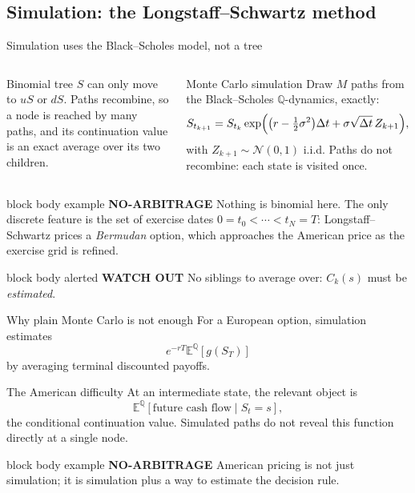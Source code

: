 \documentclass[handout,10pt,aspectratio=169]{beamer}
\newenvironment{marketbox}{\begin{beamercolorbox}[rounded=true,sep=0.7em,wd=\textwidth]{block body example}
  \textbf{\color{CourseGreen}NO-ARBITRAGE}\quad}{\end{beamercolorbox}}
\newenvironment{simplificationbox}{\begin{beamercolorbox}[rounded=true,sep=0.7em,wd=\textwidth]{block body alerted}
  \textbf{\color{CourseRed}WATCH OUT}\quad}{\end{beamercolorbox}}
\newcommand{\E}{\mathbb E}
\newcommand{\Q}{\mathbb Q}
\begin{document}
\subsection{Simulation: the Longstaff--Schwartz method}

\begin{frame}{Simulation uses the Black--Scholes model, not a tree}
\small
\begin{columns}[T,onlytextwidth]
\begin{block}{Binomial tree}
\(S\) can only move to \(uS\) or \(dS\). Paths recombine, so a node is
reached by many paths, and its continuation value is an exact average over
its two children.
\end{block}
\begin{exampleblock}{Monte Carlo simulation}
Draw \(M\) paths from the Black--Scholes \(\Q\)-dynamics, exactly:
\[
S_{t_{k+1}}=S_{t_k}\exp\Bigl(\bigl(r-\tfrac12\sigma^2\bigr)\Delta t
+\sigma\sqrt{\Delta t}\,Z_{k+1}\Bigr),
\]
with \(Z_{k+1}\sim\mathcal N(0,1)\) i.i.d. Paths do not recombine: each state
is visited once.
\end{exampleblock}
\end{columns}
\begin{marketbox}
Nothing is binomial here. The only discrete feature is the set of exercise
dates \(0=t_0<\cdots<t_N=T\): Longstaff--Schwartz prices a \emph{Bermudan}
option, which approaches the American price as the exercise grid is refined.
\end{marketbox}
\begin{simplificationbox}
No siblings to average over: \(C_k(s)\) must be \emph{estimated}.
\end{simplificationbox}
\end{frame}

\begin{frame}{Why plain Monte Carlo is not enough}
For a European option, simulation estimates
\[
e^{-rT}\E^\Q[g(S_T)]
\]
by averaging terminal discounted payoffs.
\begin{alertblock}{The American difficulty}
At an intermediate state, the relevant object is
\[
\E^\Q[\text{future cash flow}\mid S_t=s],
\]
the conditional continuation value. Simulated paths do not reveal this
function directly at a single node.
\end{alertblock}
\begin{marketbox}
American pricing is not just simulation; it is simulation plus a way to
estimate the decision rule.
\end{marketbox}
\end{frame}
\end{document}
